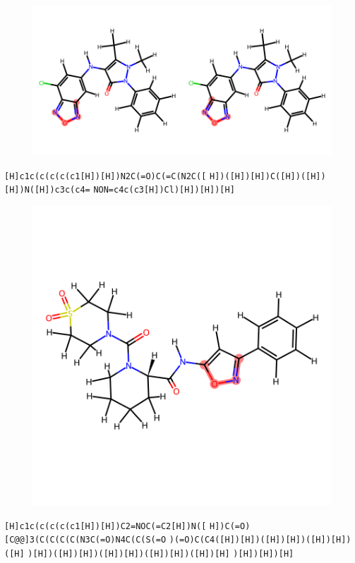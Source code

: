 \documentclass{article}
\begin{document}
\begin{figure}[ht]
\centering
    \includegraphics{mol140.png}
\end{figure}
\verb|[H]c1c(c(c(c(c1[H])[H])N2C(=O)C(=C(N2C([| \verb|H])([H])[H])C([H])([H])[H])N([H])c3c(c4=| \verb|NON=c4c(c3[H])Cl)[H])[H])[H]|

\begin{figure}[ht]
\centering
    \includegraphics{mol141.png}
\end{figure}
\verb|[H]c1c(c(c(c(c1[H])[H])C2=NOC(=C2[H])N([| \verb|H])C(=O)[C@@]3(C(C(C(C(N3C(=O)N4C(C(S(=O| \verb|)(=O)C(C4([H])[H])([H])[H])([H])[H])([H]| \verb|)[H])([H])[H])([H])[H])([H])[H])([H])[H]| \verb|)[H])[H])[H]|
\end{document}
